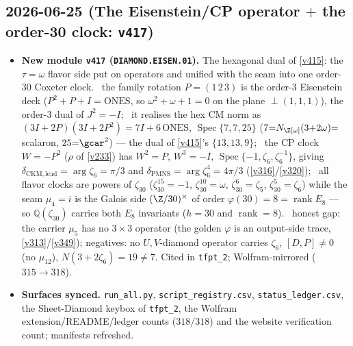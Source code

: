 \subsection*{2026-06-25 (The Eisenstein/CP operator $+$ the order-30 clock: \texttt{v417})}
\begin{itemize}
\item \textbf{New module \texttt{v417} (\texttt{DIAMOND.EISEN.01}).} The hexagonal dual of \vref{v415}:
the $\tau{=}\omega$ flavor side put on operators and unified with the seam into one order-$30$ Coxeter
clock. \mE\ the family rotation $P=(1\,2\,3)$ is the order-$3$ Eisenstein deck ($P^2{+}P{+}I=\mathrm{ONES}$,
so $\omega^2{+}\omega{+}1{=}0$ on the plane $\perp(1,1,1)$), the order-$3$ dual of $J^2{=}{-}I$; \mE\ it
realises the hex CM norm as $(3I{+}2P)(3I{+}2P^2)=7I{+}6\,\mathrm{ONES}$, $\operatorname{Spec}\{7,7,25\}$
($7{=}N_{\Z[\omega]}(3{+}2\omega){=}$ scalaron, $25{=}\gcar^2$) --- the dual of \vref{v415}'s
$\{13,13,9\}$; \mE\ the CP clock $W{=}{-}P^2$ ($\rho$ of \vref{v233}) has $W^2{=}P$, $W^3{=}{-}I$,
$\operatorname{Spec}\{-1,\zeta_6,\zeta_6^{-1}\}$, giving $\delta_{\mathrm{CKM,lead}}{=}\arg\zeta_6{=}\pi/3$
and $\delta_{\mathrm{PMNS}}{=}\arg\zeta_6^4{=}4\pi/3$ (\vref{v316}/\vref{v320}); \mE\ all flavor clocks are
powers of $\zeta_{30}$ ($\zeta_{30}^{15}{=}{-}1$, $\zeta_{30}^{10}{=}\omega$, $\zeta_{30}^{6}{=}\zeta_5$,
$\zeta_{30}^{5}{=}\zeta_6$) while the seam $\mu_4{=}i$ is the Galois side $(\Z/30)^\times$ of order
$\varphi(30){=}8{=}\operatorname{rank}E_8$ --- so $\mathbb Q(\zeta_{30})$ carries both $E_8$ invariants
($h{=}30$ and $\operatorname{rank}{=}8$). \mC\ honest gap: the carrier $\mu_5$ has no $3{\times}3$
operator (the golden $\varphi$ is an output-side trace, \vref{v313}/\vref{v349}); negatives: no
$U,V$-diamond operator carries $\zeta_6$, $[D,P]\neq0$ (no $\mu_{12}$), $N(3{+}2\zeta_6){=}19{\neq}7$.
Cited in \texttt{tfpt\_2}; Wolfram-mirrored ($315\to318$).
\item \textbf{Surfaces synced.} \texttt{run\_all.py}, \texttt{script\_registry.csv},
\texttt{status\_ledger.csv}, the Sheet-Diamond keybox of \texttt{tfpt\_2}, the Wolfram
extension/README/ledger counts ($318/318$) and the website verification count; manifests refreshed.
\end{itemize}

